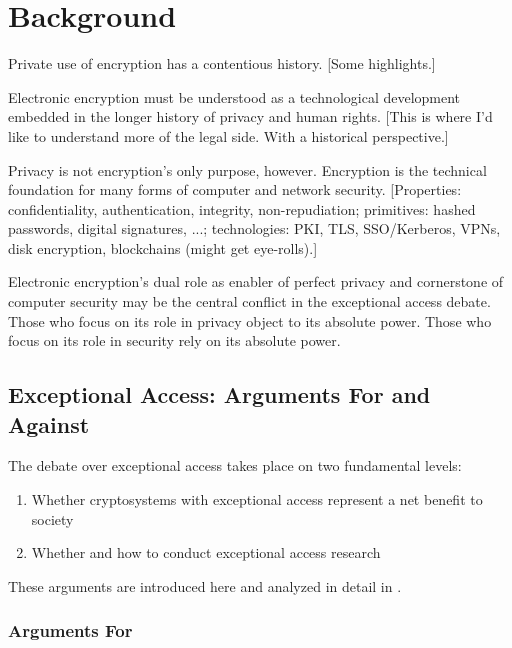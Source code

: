 \chapter{Background}
\label{chap-background}

Private use of encryption has a contentious history. [Some highlights.]

Electronic encryption must be understood as a technological development embedded in the longer history of privacy and
human rights. [This is where I'd like to understand more of the legal side. With a historical perspective.]

Privacy is not encryption's only purpose, however. Encryption is the technical foundation for many forms of computer and
network security. [Properties: confidentiality, authentication, integrity, non-repudiation; primitives: hashed
passwords, digital signatures, ...; technologies: PKI, TLS, SSO/Kerberos, VPNs, disk encryption, blockchains (might get
eye-rolls).]

Electronic encryption's dual role as enabler of perfect privacy and cornerstone of computer security may be the central
conflict in the exceptional access debate. Those who focus on its role in privacy object to its absolute power. Those
who focus on its role in security rely on its absolute power.


\section{Exceptional Access: Arguments For and Against}
\label{sec-argsbackground}

The debate over exceptional access takes place on two fundamental levels:
\begin{enumerate}
    \item Whether cryptosystems with exceptional access represent a net benefit to society
    \item Whether and how to conduct exceptional access research
\end{enumerate}

These arguments are introduced here and analyzed in detail in .

\subsection{Arguments For}

